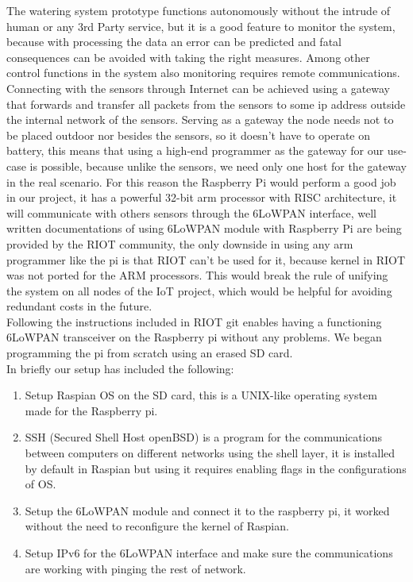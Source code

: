\documentclass[11pt,paper=a4,parskip=half]{scrartcl}
\begin{document}
The watering system prototype functions autonomously without the intrude of
human or any 3rd Party service, but it is a good feature to monitor the system,
because with processing the data an error can be predicted and fatal
consequences can be avoided with taking the right measures. Among other control
functions in the system also monitoring requires remote communications.
Connecting with the sensors through Internet can be achieved using a gateway
that forwards and transfer all packets from the sensors to some ip address
outside the internal network of the sensors. Serving as a gateway the node
needs not to be placed outdoor nor besides the sensors, so it doesn't have to
operate on battery, this means that using a high-end programmer as the gateway
for our use-case is possible, because unlike the sensors, we need only one host
for the gateway in the real scenario. For this reason the Raspberry Pi would
perform a good job in our project, it has a powerful 32-bit arm processor with
RISC architecture, it will communicate with others sensors through the 6LoWPAN
interface, well written documentations of using 6LoWPAN module with Raspberry Pi
are being provided by the RIOT community, the only downside in using any arm
programmer like the pi is that RIOT can't be used for it, because kernel in
RIOT was not ported for the ARM processors. This would break the rule of
unifying the system on all nodes of the IoT project, which would be helpful for
avoiding redundant costs in the future.
\\Following the instructions included in RIOT git \cite{riot_lowpan} enables having
a functioning 6LoWPAN transceiver on the Raspberry pi without any problems. We
began programming the pi from scratch using an erased SD card.
\\
In briefly our setup has included the following:
\begin{enumerate}
	\item Setup Raspian OS on the SD card, this is a UNIX-like operating system made for the Raspberry pi.
	\item SSH (Secured Shell Host  openBSD) is a program for the communications between computers on different networks using the shell layer, it is installed by default in Raspian but using it requires enabling flags in the configurations of OS.
	\item Setup the 6LoWPAN module and connect it to the raspberry pi, it worked without the need to reconfigure the kernel of Raspian.
	\item Setup IPv6 for the 6LoWPAN interface and make sure the communications are working with pinging the rest of network.
\end{enumerate}
\end{document}

